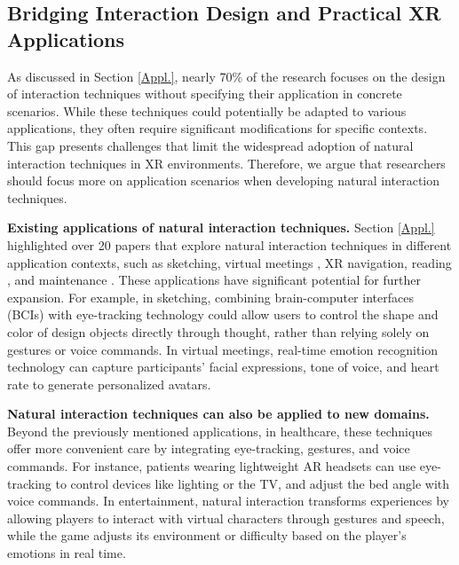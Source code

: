 \documentclass[review]{fcs}
\begin{document}
\subsection{Bridging Interaction Design and Practical XR Applications}
\label{4.4}


As discussed in Section \ref{Appl.}, nearly 70\% of the research focuses on the design of interaction techniques without specifying their application in concrete scenarios. While these techniques could potentially be adapted to various applications, they often require significant modifications for specific contexts. This gap presents challenges that limit the widespread adoption of natural interaction techniques in XR environments. Therefore, we argue that researchers should focus more on application scenarios when developing natural interaction techniques.

\textbf{Existing applications of natural interaction techniques.} Section \ref{Appl.} highlighted over 20 papers that explore natural interaction techniques in different application contexts, such as sketching\cite{DBLP:journals/imwut/ChenLYZ22, DBLP:journals/tvcg/SongDK23}, virtual meetings \cite{DBLP:conf/vr/SaintAubertAMPAL23, 10462901}, XR navigation\cite{DBLP:conf/vr/QuereMJWW24, DBLP:conf/chi/WangYWJ024}, reading \cite{DBLP:conf/ismar/LeeHM22, DBLP:conf/ismar/MengXL22}, and maintenance \cite{DBLP:conf/vr/QuereMJWW24}. These applications have significant potential for further expansion. For example, in sketching, combining brain-computer interfaces (BCIs) with eye-tracking technology could allow users to control the shape and color of design objects directly through thought, rather than relying solely on gestures or voice commands. In virtual meetings, real-time emotion recognition technology can capture participants' facial expressions, tone of voice, and heart rate to generate personalized avatars.

\textbf{Natural interaction techniques can also be applied to new domains.} Beyond the previously mentioned applications, in healthcare, these techniques offer more convenient care by integrating eye-tracking, gestures, and voice commands. For instance, patients wearing lightweight AR headsets can use eye-tracking to control devices like lighting or the TV, and adjust the bed angle with voice commands.
In entertainment, natural interaction transforms experiences by allowing players to interact with virtual characters through gestures and speech, while the game adjusts its environment or difficulty based on the player's emotions in real time.
\end{document}
